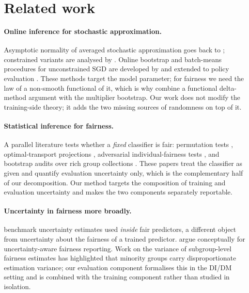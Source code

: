 \documentclass[10pt,twocolumn]{article}
\begin{document}
\section{Related work}
\label{sec:related}

\paragraph{Online inference for stochastic approximation.}
Asymptotic normality of averaged stochastic approximation goes back to
\citet{polyak1992}; constrained variants are analysed by \citet{duchi2016}.  Online bootstrap and
batch-means procedures for unconstrained SGD are developed by \citet{fang2018,chen2016,zhu2021} and
extended to policy evaluation \citep{ramprasad2023}.  These methods target the model parameter; for
fairness we need the law of a non-smooth functional of it, which is why \citet{roy2026uq} combine a
functional delta-method argument with the multiplier bootstrap.  Our work does not modify the
training-side theory; it adds the two missing sources of randomness on top of it.

\paragraph{Statistical inference for fairness.}
A parallel literature tests whether a \emph{fixed} classifier is fair: permutation tests
\citep{diciccio2020}, optimal-transport projections \citep{taskesen2021}, adversarial individual-fairness
tests \citep{maity2021}, and bootstrap audits over rich group collections \citep{cherian2023}.  These
papers treat the classifier as given and quantify evaluation uncertainty only, which is the
complementary half of our decomposition.  Our method targets the composition of training and
evaluation uncertainty and makes the two components separately reportable.

\paragraph{Uncertainty in fairness more broadly.}
\citet{rosenblatt2024} benchmark uncertainty estimates used \emph{inside} fair predictors, a different
object from uncertainty about the fairness of a trained predictor.  \citet{moreau2024} argue
conceptually for uncertainty-aware fairness reporting.  Work on the variance of subgroup-level
fairness estimates has highlighted that minority groups carry disproportionate estimation variance;
our evaluation component formalises this in the DI/DM setting and is combined with the training
component rather than studied in isolation.
\end{document}
